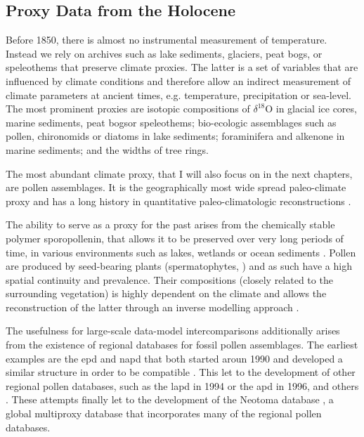 \begin{refsection}
\subsection{Proxy Data from the Holocene}  \label{sec:intro-paleo-data}
Before 1850, there is almost no instrumental measurement of temperature. Instead we rely on archives such as lake sediments, glaciers, peat bogs, or speleothems that preserve climate proxies. The latter is a set of variables that are influenced by climate conditions and therefore allow an indirect measurement of climate parameters at ancient times, e.g. temperature, precipitation or sea-level. The most prominent proxies are isotopic compositions of $\delta^{18}$O in glacial ice cores\addref, marine sediments\addref, peat bogs\addref or speleothems\addref; bio-ecologic assemblages such as pollen\addref, chironomids \addref or diatoms \addref in lake sediments; foraminifera and alkenone in marine sediments\addref; and the widths of tree rings.

The most abundant climate proxy, that I will also focus on in the next chapters, are pollen assemblages. It is the  geographically most wide spread paleo-climate proxy \citep{BirksBirks1980}  and has a long history in quantitative paleo-climatologic reconstructions \citep[e.g.][]{Nichols1967, Nichols1969, Bradley1985}.

The ability to serve as a proxy for the past arises from the chemically stable polymer sporopollenin, that allows it to be preserved over very long periods of time, in various environments such as lakes, wetlands or ocean sediments  \citep{FaegriKalandKrzywinski1989, Havinga1967}. Pollen are produced by seed-bearing plants (spermatophytes, \cite{Wodehouse1935} ) and as such have a high spatial continuity and prevalence. Their compositions (closely related to the surrounding vegetation) is highly dependent on the climate and allows the reconstruction of the latter through an inverse modelling approach .

The usefulness for large-scale data-model intercomparisons additionally arises from the existence of regional databases for fossil pollen assemblages. The earliest examples are the \gls{epd} and \gls{napd}  that both started aroun 1990 and developed a similar structure in order to be compatible \citep{Grimm2008, FyfeBeaulieuBinneyEtAl2009} . This let to the development of other regional pollen databases, such as the \gls{lapd} \citep[LAPD, ][]{FlantuaHooghiemstraGrimmEtAl2015, MarchantAlmeidaBehlingEtAl2002} in 1994 or the \gls{apd} \citep{VincensLezineBuchetEtAl2007} in 1996, and others \citep[see][]{Grimm2008}. These attempts finally let to the development of the Neotoma database \citep{WilliamsGrimmBloisEtAl2018}, a global multiproxy database that incorporates many of the regional pollen databases.


\end{refsection}
